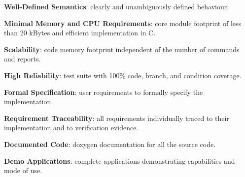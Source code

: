 \begin{fw_itemize}
\item{} \textbf{Well-{}Defined Semantics}: clearly and unambiguously defined behaviour.
\item{} \textbf{Minimal Memory and CPU Requirements}: core module footprint of less than 20 kBytes and efficient implementation in C.
\item{} \textbf{Scalability}: code memory footprint independent of the number of commands and reports.
\item{} \textbf{High Reliability}: test suite with 100\% code, branch, and condition coverage.
\item{} \textbf{Formal Specification}: user requirements to formally specify the implementation.
\item{} \textbf{Requirement Traceability}: all requirements individually traced to their implementation and to verification evidence.
\item{} \textbf{Documented Code}: doxygen documentation for all the source code.
\item \textbf{Demo Applications}: complete applications demonstrating capabilities and mode of use.
\end{fw_itemize}

